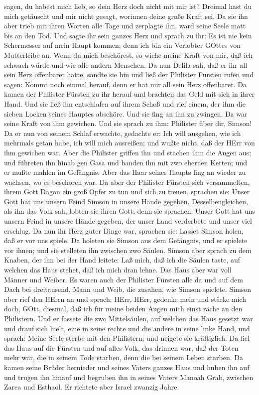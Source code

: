 sagen, du habest mich lieb, so dein Herz doch nicht mit mir ist? Dreimal
hast du mich getäuscht und mir nicht gesagt, worinnen deine große Kraft
sei.  Da sie ihn aber trieb mit ihren Worten alle Tage und
zerplagte ihn, ward seine Seele matt bis an den Tod.  Und
sagte ihr sein ganzes Herz und sprach zu ihr: Es ist nie kein
Schermesser auf mein Haupt kommen; denn ich bin ein Verlobter GOttes von
Mutterleibe an. Wenn du mich beschörest, so wiche meine Kraft von mir,
daß ich schwach würde und wie alle andern Menschen.  Da nun
Delila sah, daß er ihr all sein Herz offenbaret hatte, sandte sie hin
und ließ der Philister Fürsten rufen und sagen: Kommt noch einmal
herauf, denn er hat mir all sein Herz offenbaret. Da kamen der Philister
Fürsten zu ihr herauf und brachten das Geld mit sich in ihrer Hand.
 Und sie ließ ihn entschlafen auf ihrem Schoß und rief
einem, der ihm die sieben Locken seines Hauptes abschöre. Und sie fing
an ihn zu zwingen. Da war seine Kraft von ihm gewichen. 
Und sie sprach zu ihm: Philister über dir, Simson! Da er nun von seinem
Schlaf erwachte, gedachte er: Ich will ausgehen, wie ich mehrmals getan
habe, ich will mich ausreißen; und wußte nicht, daß der HErr von ihm
gewichen war.  Aber die Philister griffen ihn und stachen
ihm die Augen aus; und führeten ihn hinab gen Gasa und banden ihn mit
zwo ehernen Ketten; und er mußte mahlen im Gefängnis.  Aber
das Haar seines Haupts fing an wieder zu wachsen, wo es beschoren war.
 Da aber der Philister Fürsten sich versammelten, ihrem
Gott Dagon ein groß Opfer zu tun und sich zu freuen, sprachen sie: Unser
Gott hat uns unsern Feind Simson in unsere Hände gegeben. 
Desselbengleichen, als ihn das Volk sah, lobten sie ihren Gott; denn sie
sprachen: Unser Gott hat uns unsern Feind in unsere Hände gegeben, der
unser Land verderbete und unser viel erschlug.  Da nun ihr
Herz guter Dinge war, sprachen sie: Lasset Simson holen, daß er vor uns
spiele. Da holeten sie Simson aus dem Gefängnis, und er spielete vor
ihnen; und sie stelleten ihn zwischen zwo Säulen.  Simson
aber sprach zu dem Knaben, der ihn bei der Hand leitete: Laß mich, daß
ich die Säulen taste, auf welchen das Haus stehet, daß ich mich dran
lehne.  Das Haus aber war voll Männer und Weiber. Es waren
auch der Philister Fürsten alle da und auf dem Dach bei dreitausend,
Mann und Weib, die zusahen, wie Simson spielete.  Simson
aber rief den HErrn an und sprach: HErr, HErr, gedenke mein und stärke
mich doch, GOtt, diesmal, daß ich für meine beiden Augen mich einst
räche an den Philistern.  Und er fassete die zwo
Mittelsäulen, auf welchen das Haus gesetzt war und drauf sich hielt,
eine in seine rechte und die andere in seine linke Hand, 
und sprach: Meine Seele sterbe mit den Philistern; und neigete sie
kräftiglich. Da fiel das Haus auf die Fürsten und auf alles Volk, das
drinnen war, daß der Toten mehr war, die in seinem Tode starben, denn
die bei seinem Leben starben.  Da kamen seine Brüder
hernieder und seines Vaters ganzes Haus und huben ihn auf und trugen ihn
hinauf und begruben ihn in seines Vaters Manoah Grab, zwischen Zarea und
Esthaol. Er richtete aber Israel zwanzig Jahre.

